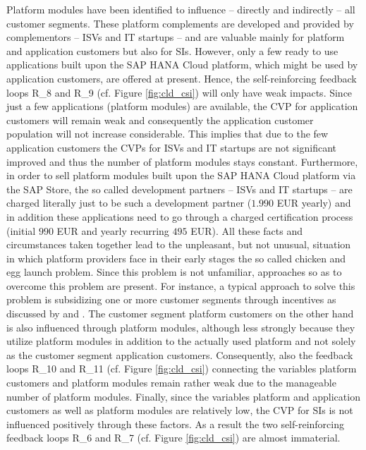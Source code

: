 Platform modules have been identified to influence -- directly and indirectly -- all customer segments. These platform complements are developed and provided by complementors -- \acp{ISV} and \ac{IT} startups -- and are valuable mainly for platform and application customers but also for \acp{SI}. However, only a few ready to use applications built upon the SAP HANA Cloud platform, which might be used by application customers, are offered at present. Hence, the self-reinforcing feedback loops R\_8 and R\_9 (cf. Figure \ref{fig:cld_csi}) will only have weak impacts. Since just a few applications (platform modules) are available, the \ac{CVP} for application customers will remain weak and consequently the application customer population will not increase considerable. This implies that due to the few application customers the \acp{CVP} for \acp{ISV} and \ac{IT} startups are not significant improved and thus the number of platform modules stays constant. Furthermore, in order to sell platform modules built upon the SAP HANA Cloud platform via the SAP Store, the so called development partners -- \acp{ISV} and \ac{IT} startups -- are charged literally just to be such a development partner ($1.990$ \ac{EUR} yearly) and in addition these applications need to go through a charged certification process (initial $990$ \ac{EUR} and yearly recurring $495$ \ac{EUR}). All these facts and circumstances taken together lead to the unpleasant, but not unusual, situation in which platform providers face in their early stages the so called chicken and egg launch problem. Since this problem is not unfamiliar, approaches so as to overcome this problem are present. For instance, a typical approach to solve this problem is subsidizing one or more customer segments through incentives as discussed by \citet[pp. 1,5]{Eisenmann2006} and \citet[pp. 195-196]{Evans2003}. The customer segment platform customers on the other hand is also influenced through platform modules, although less strongly because they utilize platform modules in addition to the actually used platform and not solely as the customer segment application customers. Consequently, also the feedback loops R\_10 and R\_11 (cf. Figure \ref{fig:cld_csi}) connecting the variables platform customers and platform modules remain rather weak due to the manageable number of platform modules. Finally, since the variables platform and application customers as well as platform modules are relatively low, the \ac{CVP} for \acp{SI} is not influenced positively through these factors. As a result the two self-reinforcing feedback loops R\_6 and R\_7 (cf. Figure \ref{fig:cld_csi}) are almost immaterial.

